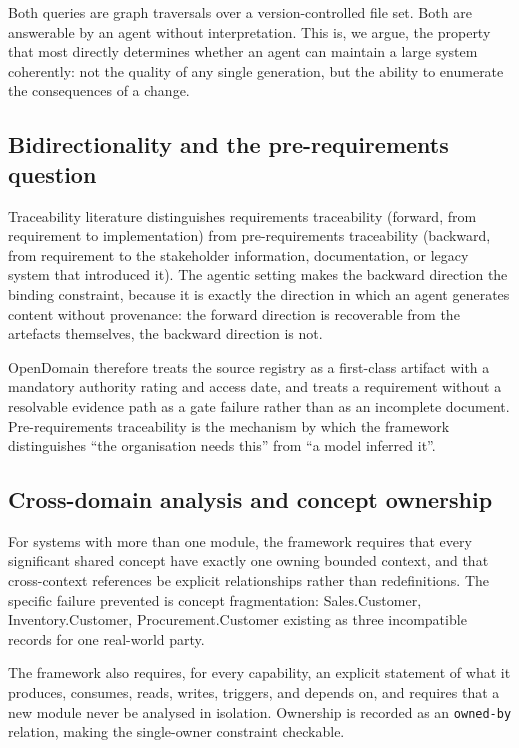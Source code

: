 \documentclass[11pt,a4paper]{article}
\begin{document}
Both queries are graph traversals over a version-controlled file set. Both are answerable by an agent without interpretation. This is, we argue, the property that most directly determines whether an agent can maintain a large system coherently: not the quality of any single generation, but the ability to enumerate the consequences of a change.

\subsection{Bidirectionality and the pre-requirements question}

Traceability literature distinguishes requirements traceability (forward, from requirement to implementation) from pre-requirements traceability (backward, from requirement to the stakeholder information, documentation, or legacy system that introduced it). The agentic setting makes the backward direction the binding constraint, because it is exactly the direction in which an agent generates content without provenance: the forward direction is recoverable from the artefacts themselves, the backward direction is not.

OpenDomain therefore treats the source registry as a first-class artifact with a mandatory authority rating and access date, and treats a requirement without a resolvable evidence path as a gate failure rather than as an incomplete document. Pre-requirements traceability is the mechanism by which the framework distinguishes ``the organisation needs this'' from ``a model inferred it''.

\subsection{Cross-domain analysis and concept ownership}

For systems with more than one module, the framework requires that every significant shared concept have exactly one owning bounded context, and that cross-context references be explicit relationships rather than redefinitions. The specific failure prevented is concept fragmentation: Sales.Customer, Inventory.Customer, Procurement.Customer existing as three incompatible records for one real-world party.

The framework also requires, for every capability, an explicit statement of what it produces, consumes, reads, writes, triggers, and depends on, and requires that a new module never be analysed in isolation. Ownership is recorded as an \texttt{owned-by} relation, making the single-owner constraint checkable.
\end{document}
